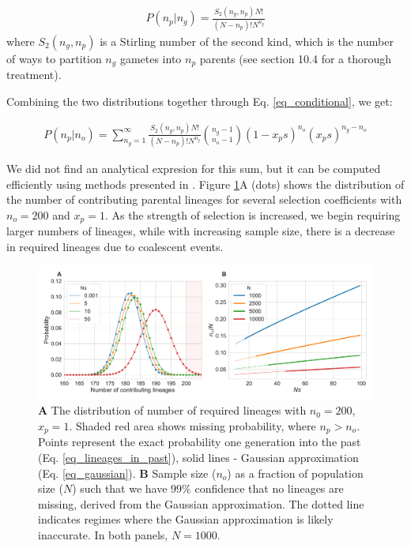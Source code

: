 \documentclass[review]{elsarticle}
\begin{document}
\begin{align}
  \label{eq_occupancy}
  P(n_p|n_g) = \frac{S_2(n_g,n_p) N!}{(N-n_p)! N^{n_g}}
\end{align}
where $S_2(n_g,n_p)$ is a Stirling number of the second kind, which is the number of ways to
partition $n_g$ gametes into $n_p$ parents (see \cite{JohnsonEtAl2005} section 10.4 for a thorough
treatment).

Combining the two distributions together through Eq. \ref{eq_conditional}, we get:

\begin{align}
  \label{eq_lineages_in_past}
   P(n_p|n_o) = \sum_{n_g=1}^{\infty} \frac{S_2(n_g,n_p) N!}{(N-n_p)! N^{n_g}} \binom{n_g-1}{n_o-1}(1-x_ps)^{n_o}(x_ps)^{n_g-n_o}
\end{align}

We did not find an analytical expresion for this sum, but it can be computed
efficiently using methods presented in \citep{ONeill2019}. Figure \ref{fig_combined}A (dots) shows
the distribution of the number of contributing parental lineages for several selection coefficients with $n_o=200$ 
and $x_p=1$. %
As the strength of selection
is increased, we begin requiring larger numbers of lineages, while with increasing sample size,
there is a decrease in required lineages due to coalescent events.

\begin{figure}
  \centering
  \includegraphics[width=\textwidth]{fig/combined.pdf}
  \caption{\textbf{A} The distribution of number of required lineages with $n_0=200$, $x_p=1$. Shaded
    red area shows missing probability, where $n_p > n_o$. Points represent the exact probability one
    generation into the past (Eq. \ref{eq_lineages_in_past}), solid lines - Gaussian approximation
    (Eq. \ref{eq_gaussian}). \textbf{B} Sample size ($n_o$) as a fraction of population size ($N$)
    such that we have $99\%$ confidence that no lineages are missing, derived from the Gaussian
    approximation. The dotted line indicates regimes where the Gaussian approximation is likely inaccurate. 
     In both panels, $N=1000$.}
  \label{fig_combined}
\end{figure}
\end{document}
